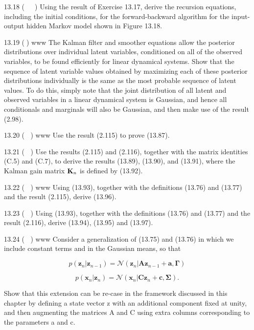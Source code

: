 \documentclass[
  10
]{article}
\begin{document}
13.18 (  ) Using the result of Exercise 13.17, derive the recursion
equations, including the initial conditions, for the forward-backward
algorithm for the input-output hidden Markov model shown in Figure
13.18.

13.19 () www The Kalman filter and smoother equations allow the
posterior distributions over individual latent variables, conditioned on
all of the observed variables, to be found efficiently for linear
dynamical systems. Show that the sequence of latent variable values
obtained by maximizing each of these posterior distributions
individually is the same as the most probable sequence of latent values.
To do this, simply note that the joint distribution of all latent and
observed variables in a linear dynamical system is Gaussian, and hence
all conditionals and marginals will also be Gaussian, and then make use
of the result (2.98).

13.20 ( ) www Use the result (2.115) to prove (13.87).

13.21 ( ) Use the results (2.115) and (2.116), together with the matrix
identities (C.5) and (C.7), to derive the results (13.89), (13.90), and
(13.91), where the Kalman gain matrix \({ \bf K } _ { n }\) is defined
by (13.92).

13.22 ( ) www Using (13.93), together with the definitions (13.76) and
(13.77) and the result (2.115), derive (13.96).

13.23 ( ) Using (13.93), together with the definitions (13.76) and
(13.77) and the result (2.116), derive (13.94), (13.95) and (13.97).

13.24 ( ) www Consider a generalization of (13.75) and (13.76) in which
we include constant terms and in the Gaussian means, so that

\[
p (\mathbf {z} _ {n} | \mathbf {z} _ {n - 1}) = \mathcal {N} (\mathbf {z} _ {n} | \mathbf {A z} _ {n - 1} + \mathbf {a}, \boldsymbol {\Gamma})\tag{13.127}
\]

\[
p (\mathbf {x} _ {n} | \mathbf {z} _ {n}) = \mathcal {N} (\mathbf {x} _ {n} | \mathbf {C z} _ {n} + \mathbf {c}, \boldsymbol {\Sigma}).\tag{13.128}
\]

Show that this extension can be re-case in the framework discussed in
this chapter by defining a state vector z with an additional component
fixed at unity, and then augmenting the matrices A and C using extra
columns corresponding to the parameters a and c.~
\end{document}
